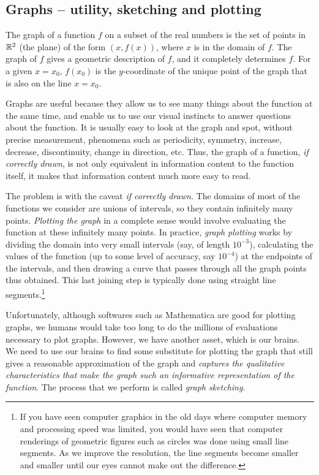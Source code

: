 \documentclass[10pt]{amsart}
\begin{document}
\subsection{Graphs -- utility, sketching and plotting}

The graph of a function $f$ on a subset of the real numbers is the set
of points in $\mathbb{R}^2$ (the plane) of the form $(x,f(x))$, where $x$ is
in the domain of $f$. The graph of $f$ gives a geometric description
of $f$, and it completely determines $f$. For a given $x = x_0$,
$f(x_0)$ is the $y$-coordinate of the unique point of the graph that
is also on the line $x = x_0$.

Graphs are useful because they allow us to see many things about the
function at the same time, and enable us to use our visual instincts
to answer questions about the function. It is usually easy to look at
the graph and spot, without precise measurement, phenomena such as
periodicity, symmetry, increase, decrease, discontinuity, change in
direction, etc. Thus, the graph of a function, {\em if correctly
drawn}, is not only equivalent in information content to the function
itself, it makes that information content much more easy to read.

The problem is with the caveat {\em if correctly drawn}. The domains
of most of the functions we consider are unions of intervals, so they
contain infinitely many points. {\em Plotting the graph} in a complete
sense would involve evaluating the function at these infinitely many
points. In practice, {\em graph plotting} works by dividing the domain
into very small intervals (say, of length $10^{-3}$), calculating the
values of the function (up to some level of accuracy, say $10^{-4}$)
at the endpoints of the intervals, and then drawing a curve that
passes through all the graph points thus obtained. This last joining
step is typically done using straight line segments.\footnote{If you
have seen computer graphics in the old days where computer memory and
processing speed was limited, you would have seen that computer
renderings of geometric figures such as circles was done using small
line segments. As we improve the resolution, the line segments become
smaller and smaller until our eyes cannot make out the difference.}

Unfortunately, although softwares such as Mathematica are good for
plotting graphs, we humans would take too long to do the millions of
evaluations necessary to plot graphs. However, we have another asset,
which is our brains. We need to use our brains to find some substitute
for plotting the graph that still gives a reasonable approximation of
the graph and {\em captures the qualitative characteristics that make
the graph such an informative representation of the function}. The
process that we perform is called {\em graph sketching}.
\end{document}
